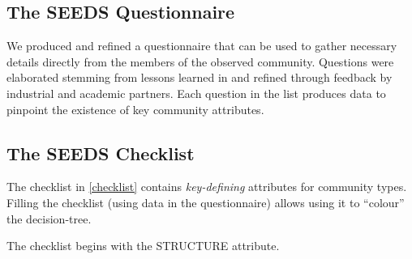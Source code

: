 
\subsection{The SEEDS Questionnaire}\label{quest}

We produced and refined a questionnaire that can be used to gather necessary details directly from the members of the observed community. Questions were elaborated stemming from lessons learned in \cite{specissue} and refined through feedback by industrial and academic partners. Each question in the list produces data to pinpoint the existence of key community attributes.

\subsection{The SEEDS Checklist}\label{cl}

The checklist in \ref{checklist} contains \emph{key-defining} attributes for community types. Filling the checklist (using data in the questionnaire) allows using it to ``colour'' the decision-tree.

The checklist begins with the STRUCTURE attribute. 

